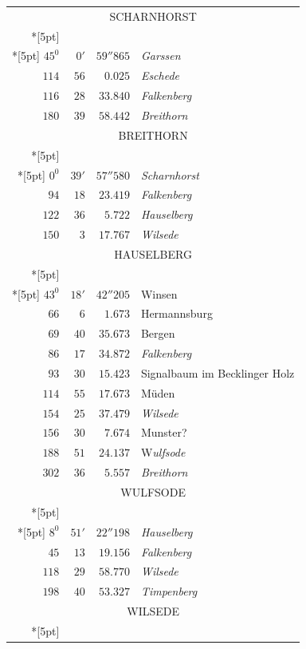 \clearpage
{}%
\begingroup
\fontsize{10.5}{13}\selectfont
\setlength{\tabcolsep}{3pt}
\setlength{\LTpre}{2pt}
\setlength{\LTpost}{2pt}
\begin{longtable}{@{}rrrp{.61\linewidth}@{}}
\multicolumn{4}{c}{\strut SCHARNHORST}\\*[5pt]
\multicolumn{4}{c}{\(-133392.348\)\qquad\(-21418.103\)}\\*[5pt]
\(45^{0}\)&\(0'\)&\(59''865\)&\raggedright \textit{Garssen}\tabularnewline
\(114\)&\(56\)&\(0.025\)&\raggedright \textit{Eschede}\tabularnewline
\(116\)&\(28\)&\(33.840\)&\raggedright \textit{Falkenberg}\tabularnewline
\(180\)&\(39\)&\(58.442\)&\raggedright \textit{Breithorn}\tabularnewline
\multicolumn{4}{c}{\strut BREITHORN}\\*[5pt]
\multicolumn{4}{c}{\(-144611.129\)\qquad\(-21548.543\)}\\*[5pt]
\(0^{0}\)&\(39'\)&\(57''580\)&\raggedright \textit{Scharnhorst}\tabularnewline
\(94\)&\(18\)&\(23.419\)&\raggedright \textit{Falkenberg}\tabularnewline
\(122\)&\(36\)&\(5.722\)&\raggedright \textit{Hauselberg}\tabularnewline
\(150\)&\(3\)&\(17.767\)&\raggedright \textit{Wilsede}\tabularnewline
\multicolumn{4}{c}{\strut HAUSELBERG}\\*[5pt]
\multicolumn{4}{c}{\(-148006.363\)\qquad\(-16239.880\)}\\*[5pt]
\(43^{0}\)&\(18'\)&\(42''205\)&\raggedright Winsen\tabularnewline
\(66\)&\(6\)&\(1.673\)&\raggedright Hermannsburg\tabularnewline
\(69\)&\(40\)&\(35.673\)&\raggedright Bergen\tabularnewline
\(86\)&\(17\)&\(34.872\)&\raggedright \textit{Falkenberg}\tabularnewline
\(93\)&\(30\)&\(15.423\)&\raggedright Signalbaum im Becklinger Holz\tabularnewline
\(114\)&\(55\)&\(17.673\)&\raggedright Müden\tabularnewline
\(154\)&\(25\)&\(37.479\)&\raggedright \textit{Wilsede}\tabularnewline
\(156\)&\(30\)&\(7.674\)&\raggedright Munster?\tabularnewline
\(188\)&\(51\)&\(24.137\)&\raggedright W\textit{ulfsode}\tabularnewline
\(302\)&\(36\)&\(5.557\)&\raggedright \textit{Breithorn}\tabularnewline
\multicolumn{4}{c}{\strut WULFSODE}\\*[5pt]
\multicolumn{4}{c}{\(-171465.593\)\qquad\(-19895.232\)}\\*[5pt]
\(8^{0}\)&\(51'\)&\(22''198\)&\raggedright \textit{Hauselberg}\tabularnewline
\(45\)&\(13\)&\(19.156\)&\raggedright \textit{Falkenberg}\tabularnewline
\(118\)&\(29\)&\(58.770\)&\raggedright \textit{Wilsede}\tabularnewline
\(198\)&\(40\)&\(53.327\)&\raggedright \textit{Timpenberg}\tabularnewline
\multicolumn{4}{c}{\strut WILSEDE}\\*[5pt]

\end{longtable}
